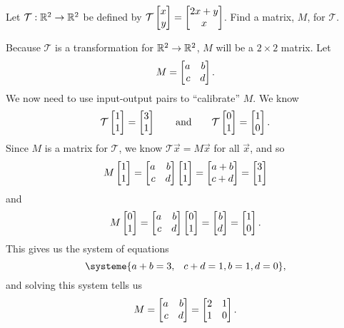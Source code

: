 \begin{example}
	Let $\mathcal T:\mathbb{R}^2\to\mathbb{R}^2$ be defined by $\mathcal T\mat{x\\y}=\matc{2x+y\\x}$. Find a matrix, $M$, for $\mathcal T$.

	Because $\mathcal T$ is a transformation for $\mathbb{R}^2\to\mathbb{R}^2$, $M$ will be a $2\times 2$ matrix. Let
	\[
		M=\mat{a&b\\c&d}.
	\]
	We now need to use input-output pairs to ``calibrate'' $M$. We know
	\[
		\mathcal T\mat{1\\1}=\mat{3\\1}\qquad\text{and}\qquad\mathcal T\mat{0\\1}=\mat{1\\0}.
	\]
	Since $M$ is a matrix for $\mathcal T$, we know $\mathcal T\vec x=M\vec x$ for all $\vec x$, and so
	\[
		M\mat{1\\1}=\mat{a&b\\c&d}\mat{1\\1}=\mat{a+b\\c+d}=\mat{3\\1}
	\]
	and
	\[
		M\mat{0\\1}=\mat{a&b\\c&d}\mat{0\\1}=\mat{b\\d}=\mat{1\\0}.
	\]
	This gives us the system of equations
	\[
		\systeme{a+b=3,\phantom{+}c+d=1,b=1,d=0},
	\]
	and solving this system tells us
	\[
		M=\mat{a&b\\c&d} = \mat{2&1\\1&0}.
	\]
\end{example}

	
